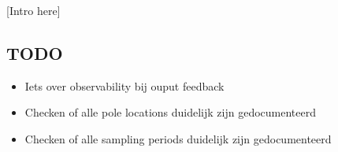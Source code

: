 [Intro here]


\subsection*{TODO}
\begin{itemize}
    \item Iets over observability bij ouput feedback
    \item Checken of alle pole locations duidelijk zijn gedocumenteerd
    \item Checken of alle sampling periods duidelijk zijn gedocumenteerd
\end{itemize}